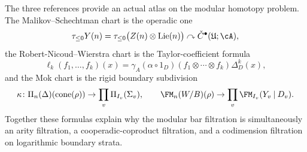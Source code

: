 \begin{summary}
\label{sum:derived-modular-atlas}
The three references provide an actual atlas on the modular homotopy problem.
The Malikov--Schechtman chart is the operadic one
\[
\tau_{\le 0}Y(n)=\tau_{\le 0}\bigl(Z(n)\otimes \operatorname{Lie}(n)\bigr)
\curvearrowright
\check C^\bullet(\mathfrak U;\cA),
\]
the Robert-Nicoud--Wierstra chart is the Taylor-coefficient formula
\[
\ell_k(f_1,\dots,f_k)(x)=\gamma_A(\alpha\circ 1_D)(f_1\otimes\cdots\otimes f_k)\Delta_D^k(x),
\]
and the Mok chart is the rigid boundary subdivision
\[
\kappa\colon \Pi_n(\Delta)(\operatorname{cone}(\rho))\to \prod_v \Pi_{I_v}(\Sigma_v),
\qquad
\FM_n(W/B)(\rho)\to \prod_v \FM_{I_v}(Y_v\mathbin{|}D_v).
\]
Together these formulas explain why the modular bar filtration is simultaneously an arity
filtration, a cooperadic-coproduct filtration, and a codimension filtration on logarithmic
boundary strata.
\end{summary}

